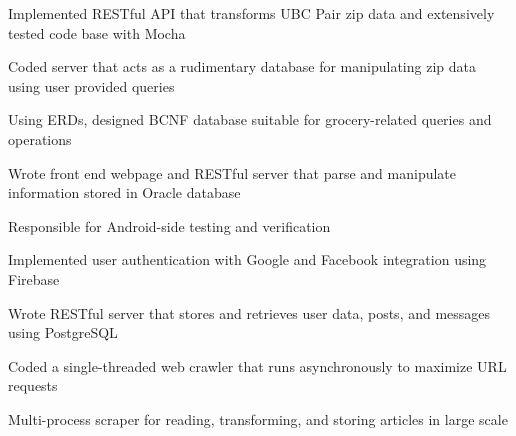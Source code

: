 \documentclass[]{deedy-resume-openfont}
\begin{document}
\begin{tightemize}
\item Implemented RESTful API that transforms UBC Pair zip data and extensively tested code base with Mocha
\item Coded server that acts as a rudimentary database for manipulating zip data using user provided queries
\end{tightemize}
\sectionsep

\begin{tightemize}
\item Using ERDs, designed BCNF database suitable for grocery-related queries and operations
\item Wrote front end webpage and RESTful server that parse and manipulate information stored in Oracle database
\end{tightemize}
\sectionsep

\begin{tightemize}
\item Responsible for Android-side testing and verification
\item Implemented user authentication with Google and Facebook integration using Firebase
\item Wrote RESTful server that stores and retrieves user data, posts, and messages using PostgreSQL
\end{tightemize}
\sectionsep

\begin{tightemize}
\item Coded a single-threaded web crawler that runs asynchronously to maximize URL requests
\item Multi-process scraper for reading, transforming, and storing articles in large scale
\end{tightemize}
\sectionsep
\end{document}
